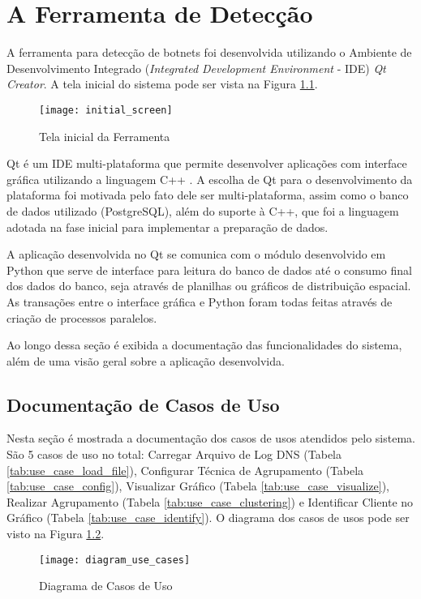\chapter{A Ferramenta de Detecção}
A ferramenta para detecção de botnets foi desenvolvida utilizando o Ambiente de Desenvolvimento Integrado (\textit{Integrated Development Environment} - IDE) \textit{Qt Creator}. A tela inicial do sistema pode ser vista na Figura \ref{fig:initial_screen}.

\begin{figure}
\centering
\texttt{[image: initial\_screen]}
\caption[Tela inicial da Ferramenta]{Tela inicial da Ferramenta} \label{fig:initial_screen}
\end{figure}

Qt é um IDE multi-plataforma que permite desenvolver aplicações com interface gráfica utilizando a linguagem C++ \citep{qtsite}. A escolha de Qt para o desenvolvimento da plataforma foi motivada pelo fato dele ser multi-plataforma, assim como o banco de dados utilizado (PostgreSQL), além do suporte à C++, que foi a linguagem adotada na fase inicial para implementar a preparação de dados.

A aplicação desenvolvida no Qt se comunica com o módulo desenvolvido em Python que serve de interface para leitura do banco de dados até o consumo final dos dados do banco, seja através de planilhas ou gráficos de distribuição espacial. As transações entre o interface gráfica e Python foram todas feitas através de criação de processos paralelos.

Ao longo dessa seção é exibida a documentação das funcionalidades do sistema, além de uma visão geral sobre a aplicação desenvolvida.

\section{Documentação de Casos de Uso}
Nesta seção é mostrada a documentação dos casos de usos atendidos pelo sistema. São 5 casos de uso no total: Carregar Arquivo de Log DNS (Tabela \ref{tab:use_case_load_file}), Configurar Técnica de Agrupamento (Tabela \ref{tab:use_case_config}), Visualizar Gráfico (Tabela \ref{tab:use_case_visualize}), Realizar Agrupamento (Tabela \ref{tab:use_case_clustering}) e Identificar Cliente no Gráfico (Tabela \ref{tab:use_case_identify}). O diagrama dos casos de usos pode ser visto na Figura \ref{fig:diagram_use_cases}. 

\begin{figure}
\centering
\texttt{[image: diagram\_use\_cases]}
\caption[Diagrama de Casos de Uso]{Diagrama de Casos de Uso} \label{fig:diagram_use_cases}
\end{figure}

